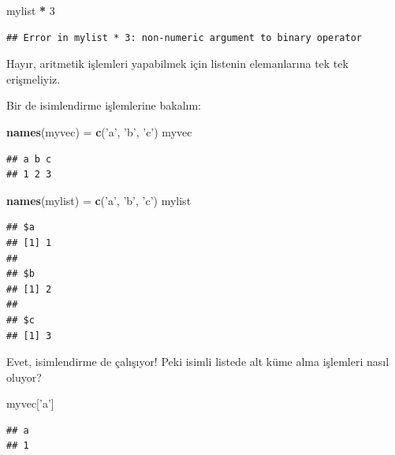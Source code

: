 \documentclass[]{book}
\newenvironment{Shaded}{\begin{snugshade}}{\end{snugshade}}
\newcommand{\DecValTok}[1]{\textcolor[rgb]{0.00,0.00,0.81}{#1}}
\newcommand{\KeywordTok}[1]{\textcolor[rgb]{0.13,0.29,0.53}{\textbf{#1}}}
\newcommand{\NormalTok}[1]{#1}
\newcommand{\OperatorTok}[1]{\textcolor[rgb]{0.81,0.36,0.00}{\textbf{#1}}}
\newcommand{\StringTok}[1]{\textcolor[rgb]{0.31,0.60,0.02}{#1}}
\begin{document}
\begin{Shaded}
\begin{Highlighting}[]
\NormalTok{mylist }\OperatorTok{*}\StringTok{ }\DecValTok{3}
\end{Highlighting}
\end{Shaded}

\begin{verbatim}
## Error in mylist * 3: non-numeric argument to binary operator
\end{verbatim}

Hayır, aritmetik işlemleri yapabilmek için listenin elemanlarına tek tek
erişmeliyiz.

Bir de isimlendirme işlemlerine bakalım:

\begin{Shaded}
\begin{Highlighting}[]
\KeywordTok{names}\NormalTok{(myvec) =}\StringTok{ }\KeywordTok{c}\NormalTok{(}\StringTok{'a'}\NormalTok{, }\StringTok{'b'}\NormalTok{, }\StringTok{'c'}\NormalTok{)}
\NormalTok{myvec}
\end{Highlighting}
\end{Shaded}

\begin{verbatim}
## a b c 
## 1 2 3
\end{verbatim}

\begin{Shaded}
\begin{Highlighting}[]
\KeywordTok{names}\NormalTok{(mylist) =}\StringTok{ }\KeywordTok{c}\NormalTok{(}\StringTok{'a'}\NormalTok{, }\StringTok{'b'}\NormalTok{, }\StringTok{'c'}\NormalTok{)}
\NormalTok{mylist}
\end{Highlighting}
\end{Shaded}

\begin{verbatim}
## $a
## [1] 1
## 
## $b
## [1] 2
## 
## $c
## [1] 3
\end{verbatim}

Evet, isimlendirme de çalışıyor! Peki isimli listede alt küme alma
işlemleri nasıl oluyor?

\begin{Shaded}
\begin{Highlighting}[]
\NormalTok{myvec[}\StringTok{'a'}\NormalTok{]}
\end{Highlighting}
\end{Shaded}

\begin{verbatim}
## a 
## 1
\end{verbatim}
\end{document}
